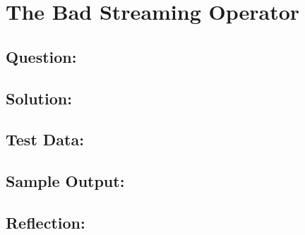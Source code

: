 \documentclass[Lab-B.tex]{subfiles}
\begin{document}
    \section{The Bad Streaming Operator}
        \subsection*{Question:}
            
        \subsection*{Solution:}

        \subsection*{Test Data:}
        
        \subsection*{Sample Output:}

        \subsection*{Reflection:}
\end{document}
